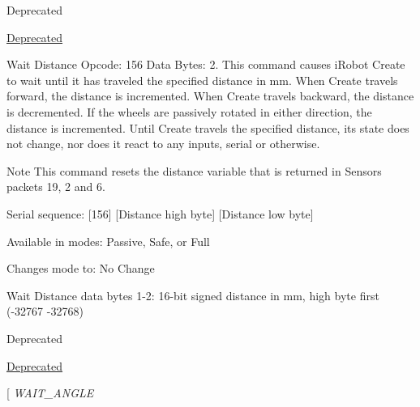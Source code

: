 \begin{Desc}
\begin{description}
\begin{DoxyRefDesc}{Deprecated}
\item[\hyperlink{deprecated__deprecated000007}{Deprecated}]\end{DoxyRefDesc}
\item[{\em 
\hypertarget{group__roomba-lib_gga305e17dfb7050ad83ea49ded2e6a2e24a35cc18edb14f8cc7586f8767d2a57585}{}W\+A\+I\+T\+\_\+\+D\+I\+S\+T\+A\+N\+C\+E\label{group__roomba-lib_gga305e17dfb7050ad83ea49ded2e6a2e24a35cc18edb14f8cc7586f8767d2a57585}
}]Wait Distance Opcode\+: 156 Data Bytes\+: 2. This command causes i\+Robot Create to wait until it has traveled the specified distance in mm. When Create travels forward, the distance is incremented. When Create travels backward, the distance is decremented. If the wheels are passively rotated in either direction, the distance is incremented. Until Create travels the specified distance, its state does not change, nor does it react to any inputs, serial or otherwise. \begin{DoxyNote}{Note}
This command resets the distance variable that is returned in Sensors packets 19, 2 and 6.
\begin{DoxyItemize}
\item Serial sequence\+: \mbox{[}156\mbox{]} \mbox{[}Distance high byte\mbox{]} \mbox{[}Distance low byte\mbox{]}
\item Available in modes\+: Passive, Safe, or Full
\item Changes mode to\+: No Change
\item Wait Distance data bytes 1-\/2\+: 16-\/bit signed distance in mm, high byte first (-\/32767 -\/32768)
\end{DoxyItemize}
\end{DoxyNote}
\begin{DoxyRefDesc}{Deprecated}
\item[\hyperlink{deprecated__deprecated000008}{Deprecated}]\end{DoxyRefDesc}
\item[{\em 
\hypertarget{group__roomba-lib_gga305e17dfb7050ad83ea49ded2e6a2e24afe16224c28a9b186c8357e539358d96e}{}W\+A\+I\+T\+\_\+\+A\+N\+G\+L\+E\label{group__roomba-lib_gga305e17dfb7050ad83ea49ded2e6a2e24afe16224c28a9b186c8357e539358d96e}
}
\end{description}
\end{Desc}
